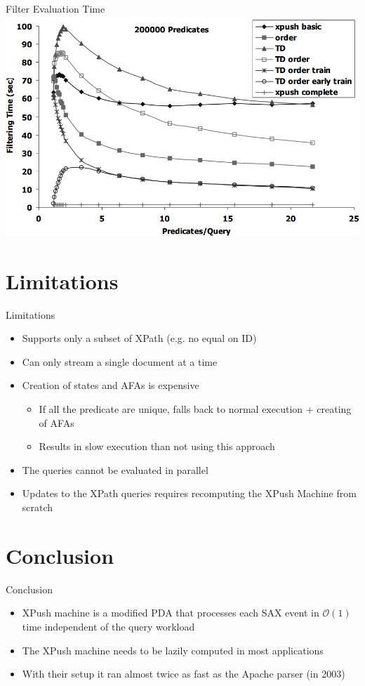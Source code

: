 \documentclass[mathserif,serif]{beamer}
\begin{document}
  \begin{frame}{Filter Evaluation Time}
    \includegraphics[width=\textwidth]{filtertime}
  \end{frame}

  \section{Limitations}
  \begin{frame}{Limitations}
    \begin{itemize}
      \item Supports only a subset of XPath (e.g. no equal on ID)
      \item Can only stream a single document at a time
      \item Creation of states and AFAs is expensive
        \begin{itemize}
          \item If all the predicate are unique, falls back to normal execution + creating of AFAs
          \item Results in slow execution than not using this approach
        \end{itemize}
      \item The queries cannot be evaluated in parallel
      \item Updates to the XPath queries requires recomputing the XPush Machine from scratch
    \end{itemize}
  \end{frame}

  \section{Conclusion}
  \begin{frame}{Conclusion}
    \begin{itemize}
      \item XPush machine is a modified PDA that processes each SAX event in $\mathcal{O}(1)$ time independent of the query workload
      \item The XPush machine needs to be lazily computed in most applications
      \item With their setup it ran almost twice as fast as the Apache parser (in 2003)
    \end{itemize}
  \end{frame}
  
\end{document}
